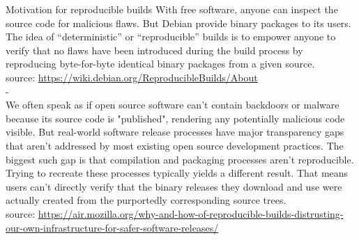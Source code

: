 \documentclass[11pt]{beamer}
\begin{document}
\begin{frame}{Motivation for reproducible builds}
With free software, anyone can inspect the source code for malicious flaws. But Debian provide binary packages to its users. The idea of “deterministic” or “reproducible” builds is to empower anyone to verify that no flaws have been introduced during the build process by reproducing byte-for-byte identical binary packages from a given source. \\
source: \href{https://wiki.debian.org/ReproducibleBuilds/About}{https://wiki.debian.org/ReproducibleBuilds/About}\\
-\\
We often speak as if open source software can't contain backdoors or malware because its source code is "published", rendering any potentially malicious code visible. But real-world software release processes have major transparency gaps that aren't addressed by most existing open source development practices. The biggest such gap is that compilation and packaging processes aren't reproducible. Trying to recreate these processes typically yields a different result. That means users can't directly verify that the binary releases they download and use were actually created from the purportedly corresponding source trees.\\
source: \href{https://air.mozilla.org/why-and-how-of-reproducible-builds-distrusting-our-own-infrastructure-for-safer-software-releases/}{https://air.mozilla.org/why-and-how-of-reproducible-builds-distrusting-our-own-infrastructure-for-safer-software-releases/}
\end{frame}
\end{document}
